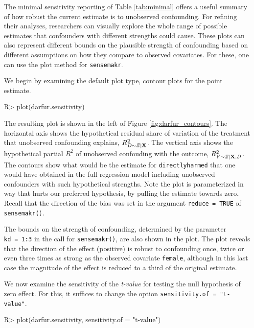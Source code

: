 \documentclass[
]{jss}
\begin{document}
The minimal sensitivity reporting of Table \ref{tab:minimal} offers a
useful summary of how robust the current estimate is to unobserved
confounding. For refining their analyses, researchers can visually
explore the whole range of possible estimates that confounders with
different strengths could cause. These plots can also represent
different bounds on the plausible strength of confounding based on
different assumptions on how they compare to observed covariates. For
these, one can use the plot method for \texttt{sensemakr}.

We begin by examining the default plot type, contour plots for the point
estimate.

\begin{CodeChunk}

\begin{CodeInput}
R> plot(darfur.sensitivity)
\end{CodeInput}
\end{CodeChunk}

The resulting plot is shown in the left of Figure
\ref{fig:darfur_contours}. The horizontal axis shows the hypothetical
residual share of variation of the treatment that unobserved confounding
explains, \(R^2_{D\sim Z| {\bf X} }\). The vertical axis shows the
hypothetical partial \(R^2\) of unobserved confouding with the outcome,
\(R^2_{Y\sim Z| {\bf X}, D}\). The contours show what would be the
estimate for \texttt{directlyharmed} that one would have obtained in the
full regression model including unobserved confounders with such
hypothetical strengths. Note the plot is parameterized in way that hurts
our preferred hypothesis, by pulling the estimate towards zero. Recall
that the direction of the bias was set in the argument
\texttt{reduce\ =\ TRUE} of \texttt{sensemakr()}.

The bounds on the strength of confounding, determined by the parameter
\texttt{kd\ =\ 1:3} in the call for \texttt{sensemakr()}, are also shown
in the plot. The plot reveals that the direction of the effect
(positive) is robust to confounding once, twice or even three times as
strong as the observed covariate \texttt{female}, although in this last
case the magnitude of the effect is reduced to a third of the original
estimate.

We now examine the sensitivity of the \emph{t-value} for testing the
null hypothesis of zero effect. For this, it suffices to change the
option \texttt{sensitivity.of\ =\ "t-value"}.

\begin{CodeChunk}

\begin{CodeInput}
R> plot(darfur.sensitivity, sensitivity.of = "t-value")
\end{CodeInput}
\end{CodeChunk}
\end{document}
